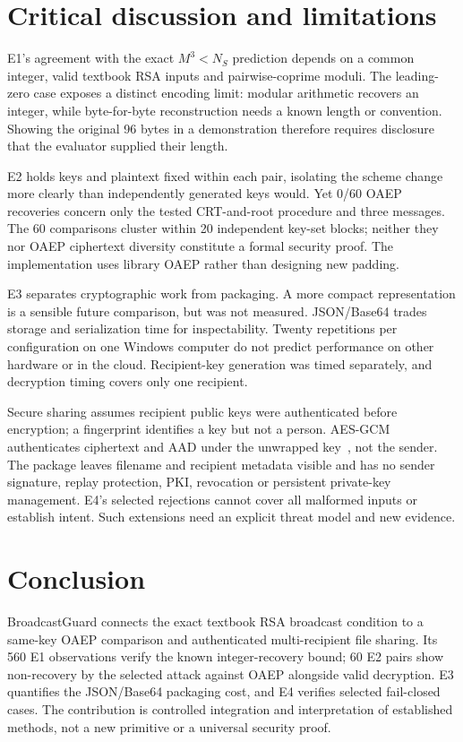 \section{Critical discussion and limitations}
E1's agreement with the exact $M^3<N_S$ prediction depends on a common integer, valid textbook RSA inputs and pairwise-coprime moduli. The leading-zero case exposes a distinct encoding limit: modular arithmetic recovers an integer, while byte-for-byte reconstruction needs a known length or convention. Showing the original 96 bytes in a demonstration therefore requires disclosure that the evaluator supplied their length.

E2 holds keys and plaintext fixed within each pair, isolating the scheme change more clearly than independently generated keys would. Yet 0/60 OAEP recoveries concern only the tested CRT-and-root procedure and three messages. The 60 comparisons cluster within 20 independent key-set blocks; neither they nor OAEP ciphertext diversity constitute a formal security proof. The implementation uses library OAEP rather than designing new padding.

E3 separates cryptographic work from packaging. A more compact representation is a sensible future comparison, but was not measured. JSON/Base64 trades storage and serialization time for inspectability. Twenty repetitions per configuration on one Windows computer do not predict performance on other hardware or in the cloud. Recipient-key generation was timed separately, and decryption timing covers only one recipient.

Secure sharing assumes recipient public keys were authenticated before encryption; a fingerprint identifies a key but not a person. AES-GCM authenticates ciphertext and AAD under the unwrapped key~\cite{dworkin2007gcm}, not the sender. The package leaves filename and recipient metadata visible and has no sender signature, replay protection, PKI, revocation or persistent private-key management. E4's selected rejections cannot cover all malformed inputs or establish intent. Such extensions need an explicit threat model and new evidence.

\section{Conclusion}
BroadcastGuard connects the exact textbook RSA broadcast condition to a same-key OAEP comparison and authenticated multi-recipient file sharing. Its 560 E1 observations verify the known integer-recovery bound; 60 E2 pairs show non-recovery by the selected attack against OAEP alongside valid decryption. E3 quantifies the JSON/Base64 packaging cost, and E4 verifies selected fail-closed cases. The contribution is controlled integration and interpretation of established methods, not a new primitive or a universal security proof.
